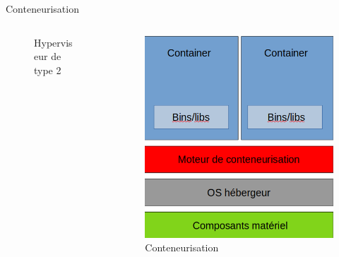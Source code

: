 \documentclass[11pt]{beamer}
\begin{document}
\begin{frame}{Conteneurisation}
\begin{columns}
\begin{column}{0.33\textwidth}
\begin{figure}
			\caption{Hyperviseur de type 2}
		\end{figure}
    \end{column}
    \begin{column}{0.33\textwidth}
        \begin{figure}
			\includegraphics[scale=0.20]{images/container.png}
			\caption{Conteneurisation}
		\end{figure}
    \end{column}
\end{columns}

\end{frame}
\end{document}
